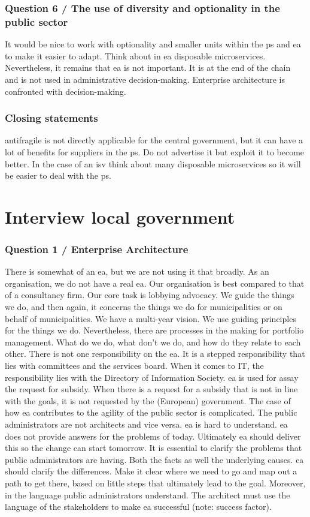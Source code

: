 \subsubsection{Question 6 / The use of diversity and optionality in the public sector}
It would be nice to work with optionality and smaller units within the \gls{ps} and \gls{ea} to make it easier to adapt. Think about in \gls{ea} disposable microservices. Nevertheless, it remains that ea is not important. It is at the end of the chain and is not used in administrative decision-making. Enterprise architecture is confronted with decision-making.
\subsubsection{Closing statements}
\Gls{antifragile} is not directly applicable for the central government, but it can have a lot of benefits for suppliers in the \gls{ps}. Do not advertise it but exploit it to become better. In the case of an \acrfull{isv} think about many disposable microservices so it will be easier to deal with the \gls{ps}.
\section{Interview local government}
\label{sec:interviewlocalgovernment}
\subsubsection{Question 1 / Enterprise Architecture}
There is somewhat of an \gls{ea}, but we are not using it that broadly. As an organisation, we do not have a real \gls{ea}. Our organisation is best compared to that of a consultancy firm. Our core task is lobbying advocacy. We guide the things we do, and then again, it concerns the things we do for municipalities or on behalf of municipalities. We have a multi-year vision. We use guiding principles for the things we do.
Nevertheless, there are processes in the making for portfolio management. What do we do, what don't we do, and how do they relate to each other. There is not one responsibility on the \gls{ea}. It is a stepped responsibility that lies with committees and the services board. When it comes to IT, the responsibility lies with the Directory of Information Society. \gls{ea} is used for assay the request for subsidy. When there is a request for a subsidy that is not in line with the goals, it is not requested by the (European) government.
The case of how \gls{ea} contributes to the agility of the public sector is complicated. The public administrators are not architects and vice versa. \gls{ea} is hard to understand. \gls{ea} does not provide answers for the problems of today. Ultimately \gls{ea} should deliver this so the change can start tomorrow. It is essential to clarify the problems that public administrators are having. Both the facts as well the underlying causes. \gls{ea} should clarify the differences. Make it clear where we need to go and map out a path to get there, based on little steps that ultimately lead to the goal. Moreover, in the language public administrators understand. The architect must use the language of the stakeholders to make \gls{ea} successful (note: success factor).
